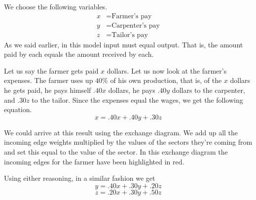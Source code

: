 \begin{solution}
    We choose the following variables.
    \[
        \begin{aligned}
            x & = \text{Farmer's pay}    \\
            y & = \text{Carpenter's pay} \\
            z & = \text{Tailor's pay}
        \end{aligned}
    \]
    As we said earlier, in this model input must equal output. That is, the amount paid by each equals the amount received by each.

    Let us say the farmer gets paid \( x \) dollars. Let us now look at the farmer's expenses. The farmer uses up \( 40\% \) of his own production, that is, of the \( x \) dollars he gets paid, he pays himself \( .40x \) dollars, he pays \( .40y \) dollars to the carpenter, and \( .30z \) to the tailor. Since the expenses equal the wages, we get the following equation.
    \[ x = .40x + .40y + .30z \]

    We could arrive at this result using the exchange diagram. We add up all the incoming edge weights multiplied by the values of the sectors they're coming from and set this equal to the value of the sector. In this exchange diagram the incoming edges for the farmer have been highlighted in red.

    \begin{center}
    \end{center}

    Using either reasoning, in a similar fashion we get
    \[ y = .40x + .30y + .20z \]
    \[ z = .20x + .30y + .50z \]


\end{solution}
